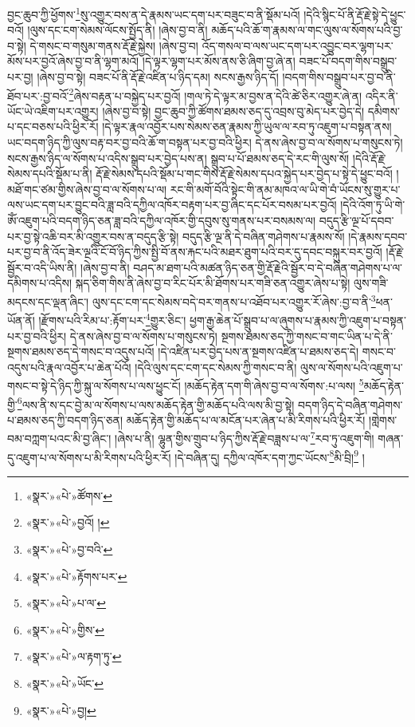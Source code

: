 བྱང་ཆུབ་ཀྱི་ཕྱོགས་\footnote{«སྣར་»«པེ་»ཚོགས་}སུ་འགྱུར་བས་ན་དེ་རྣམས་ཡང་དག་པར་བཟུང་བ་ནི་སྡོམ་པའོ། །དེའི་སྙིང་པོ་ནི་རྡོ་རྗེ་སྟེ་དེ་ཕྱུང་བའོ། །ལུས་དང་ངག་སེམས་ལོངས་སྤྱོད་ནི། །ཞེས་བྱ་བ་ནི། མཆོད་པའི་ཆོ་ག་རྣམས་ལ་གང་ལུས་ལ་སོགས་པའི་བྱ་བ་སྟེ། དེ་གསང་བ་གསུམ་གནས་རྡོ་རྗེ་སྐྱེས། །ཞེས་བྱ་བ། འོད་གསལ་བ་ལས་ཡང་དག་པར་འབྱུང་བར་ལྷག་པར་མོས་པར་བྱའོ་ཞེས་བྱ་བ་ནི་ལྷག་མའོ། །དེ་ལྟར་ལྷག་པར་མོས་ནས་ཅི་ཞིག་བྱ་ཞེ་ན། བཟང་པོ་བདག་གིས་བསྒྲུབ་པར་བྱ། །ཞེས་བྱ་བ་སྟེ། བཟང་པོ་ནི་རྡོ་རྗེ་འཛིན་པ་ཉིད་དམ། སངས་རྒྱས་ཉིད་དོ། །བདག་གིས་བསྒྲུབ་པར་བྱ་བ་ནི་ཐོབ་པར་:བྱ་བའོ་\footnote{«སྣར་»«པེ་»བྱའོ། །}ཞེས་བརྟན་པ་བསྐྱེད་པར་བྱའོ། །གལ་ཏེ་དེ་ལྟར་མ་བྱས་ན་དེའི་ཚེ་ཅིར་འགྱུར་ཞེ་ན། འདིར་ནི་ཡོང་ཡེ་འཇིག་པར་འགྱུར། །ཞེས་བྱ་བ་སྟེ། བྱང་ཆུབ་ཀྱི་ཚོགས་ཐམས་ཅད་དུ་འབྲས་བུ་མེད་པར་བྱེད་དེ། དམིགས་པ་དང་བཅས་པའི་ཕྱིར་རོ། །དེ་ལྟར་རྣལ་འབྱོར་པས་སེམས་ཅན་རྣམས་ཀྱི་ཡུལ་ལ་རབ་ཏུ་འཇུག་པ་བསྟན་ནས། ཡང་བདག་ཉིད་ཀྱི་ལུས་བརྟ་བར་བྱ་བའི་ཆོ་ག་བསྟན་པར་བྱ་བའི་ཕྱིར། དེ་ནས་ཞེས་བྱ་བ་ལ་སོགས་པ་གསུངས་ཏེ། སངས་རྒྱས་ཉིད་ལ་སོགས་པ་འདིས་སྒྲུབ་པར་བྱེད་པས་ན། སྒྲུབ་པ་པོ་ཐམས་ཅད་དེ་རང་གི་ལུས་སོ། །དེའི་རྡོ་རྗེ་སེམས་དཔའི་སྡོམ་པ་ནི། རྡོ་རྗེ་སེམས་དཔའི་སྡོམ་པ་གང་གིས་རྡོ་རྗེ་སེམས་དཔའ་སྐྱེད་པར་བྱེད་པ་སྟེ་དེ་ཕྱུང་བའོ། །མཐོ་གང་ཙམ་གྱིས་ཞེས་བྱ་བ་ལ་སོགས་པ་ལ། རང་གི་མགོ་བོའི་སྟེང་གི་ནམ་མཁའ་ལ་ཡི་གེ་བཾ་ཡོངས་སུ་གྱུར་པ་ལས་ཡང་དག་པར་བྱུང་བའི་ཟླ་བའི་དཀྱིལ་འཁོར་བརྟག་པར་བྱ་ཞིང་དང་པོར་བསམ་པར་བྱའོ། །དེའི་འོག་ཏུ་ཡི་གེ་ཨོཾ་འཇུག་པའི་བདག་ཉིད་ཅན་ཟླ་བའི་དཀྱིལ་འཁོར་གྱི་དབུས་སུ་གནས་པར་བསམས་ལ། བདུད་རྩི་ལྔ་པོ་དབབ་པར་བྱ་སྟེ་འཆི་བར་མི་འགྱུར་བས་ན་བདུད་རྩི་སྟེ། བདུད་རྩི་ལྔ་ནི་དེ་བཞིན་གཤེགས་པ་རྣམས་སོ། །དེ་རྣམས་དབབ་པར་བྱ་བ་ནི་འོད་ཟེར་ལྔའི་ངོ་བོ་ཉིད་ཀྱིས་སྤྱི་བོ་ནས་རྐང་པའི་མཐར་ཐུག་པའི་བར་དུ་དབང་བསྐུར་བར་བྱའོ། །རྡོ་རྗེ་སྦྱོར་བ་འདི་ཡིས་ནི། །ཞེས་བྱ་བ་ནི། བཤད་མ་ཐག་པའི་མཚན་ཉིད་ཅན་གྱི་རྡོ་རྗེའི་སྦྱོར་བ་དེ་བཞིན་གཤེགས་པ་ལ་དམིགས་པ་འདིས། སྐད་ཅིག་གིས་ནི་ཞེས་བྱ་བ་རིང་པོར་མི་ཐོགས་པར་གཟི་ཅན་འགྱུར་ཞེས་པ་སྟེ། ལུས་གཟི་མདངས་དང་ལྡན་ཞིང་། ལུས་དང་ངག་དང་སེམས་བདེ་བར་གནས་པ་འཐོབ་པར་འགྱུར་རོ་ཞེས་:བྱ་བ་ནི་\footnote{«སྣར་»«པེ་»བྱ་བའི་}ཕན་ཡོན་ནོ། །རྫོགས་པའི་རིམ་པ་:རྟོག་པར་\footnote{«སྣར་»«པེ་»རྟོགས་པར་}གྱུར་ཅིང་། ཕྱག་རྒྱ་ཆེན་པོ་སྒྲུབ་པ་ལ་ཞུགས་པ་རྣམས་ཀྱི་འཇུག་པ་བསྟན་པར་བྱ་བའི་ཕྱིར། དེ་ནས་ཞེས་བྱ་བ་ལ་སོགས་པ་གསུངས་ཏེ། སྔགས་ཐམས་ཅད་ཀྱི་གསང་བ་གང་ཡིན་པ་དེ་ནི་སྔགས་ཐམས་ཅད་དེ་གསང་བ་འདུས་པའོ། །དེ་འཛིན་པར་བྱེད་པས་ན་སྔགས་འཛིན་པ་ཐམས་ཅད་དེ། གསང་བ་འདུས་པའི་རྣལ་འབྱོར་པ་ཆེན་པོའོ། །དེའི་ལུས་དང་ངག་དང་སེམས་ཀྱི་གསང་བ་ནི། ལུས་ལ་སོགས་པའི་འཇུག་པ་གསང་བ་སྟེ་དེ་ཉིད་ཀྱི་སྐུ་ལ་སོགས་པ་ལས་ཕྱུང་ངོ། །མཆོད་རྟེན་དག་གི་ཞེས་བྱ་བ་ལ་སོགས་:པ་ལས། \footnote{«སྣར་»«པེ་»པ་ལ་}མཆོད་རྟེན་གྱི་\footnote{«སྣར་»«པེ་»གྱིས་}ལས་ནི་ས་དང་བྱེ་མ་ལ་སོགས་པ་ལས་མཆོད་རྟེན་གྱི་མཆོད་པའི་ལས་མི་བྱ་སྟེ། བདག་ཉིད་དེ་བཞིན་གཤེགས་པ་ཐམས་ཅད་ཀྱི་བདག་ཉིད་ཅན། མཆོད་རྟེན་གྱི་མཆོད་པ་ལ་མངོན་པར་ཞེན་པ་མི་རིགས་པའི་ཕྱིར་རོ། །གླེགས་བམ་བཀླག་པའང་མི་བྱ་ཞིང་། །ཞེས་པ་ནི། ལྷུན་གྱིས་གྲུབ་པ་ཉིད་ཀྱིས་རྡོ་རྗེ་བཟླས་པ་ལ་\footnote{«སྣར་»«པེ་»ལ་རྟག་ཏུ་}རབ་ཏུ་འཇུག་གི། གཞན་དུ་འཇུག་པ་ལ་སོགས་པ་མི་རིགས་པའི་ཕྱིར་རོ། །དེ་བཞིན་དུ། དཀྱིལ་འཁོར་དག་ཀྱང་ཡོངས་\footnote{«སྣར་»«པེ་»ཡོང་}མི་བྲི།\footnote{«སྣར་»«པེ་»བྱ།} །
